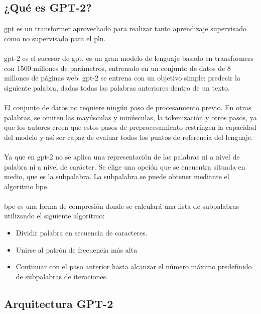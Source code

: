 \documentclass[12pt, a4paper, titlepage]{report}
\begin{document}
		        \subsection{¿Qué es GPT-2?}  
		        \acrfull{gpt} es un transformer aprovechado para realizar tanto aprendizaje supervisado como no supervisado para el \acrfull{pln}.\\\\        
		        \acrshort{gpt}-2 es el sucesor de \acrshort{gpt}, es un gran modelo de lenguaje basado en transformers con 1500 millones de parámetros, entrenado en un conjunto de datos de 8 millones de páginas web. \acrshort{gpt}-2 se entrena con un objetivo simple: predecir la siguiente palabra, dadas todas las palabras anteriores dentro de un texto. \cite{refQueesgpt}\\\\
		        El conjunto de datos no requiere ningún paso de procesamiento previo. En otras palabras, se omiten las mayúsculas y minúsculas, la tokenización y otros pasos, ya que los autores creen que estos pasos de preprocesamiento restringen la capacidad del modelo y así ser capaz de evaluar todos los puntos de referencia del lenguaje.\\\\        
		        Ya que en \acrshort{gpt}-2 no se aplica una representación de las palabras ni a nivel de palabra ni a nivel de carácter. Se elige una opción que se encuentra situada en medio, que es la subpalabra. La subpalabra se puede obtener mediante el algoritmo \acrfull{bpe}.\\\\
		        \acrshort{bpe} es una forma de compresión donde se calculará una lista de subpalabras utilizando el siguiente algoritmo: \cite{refbpe}
		        \begin{itemize}
		        	\item Dividir palabra en secuencia de caracteres.
		        	\item Unirse al patrón de frecuencia más alta
		        	\item Continuar con el paso anterior hasta alcanzar el número máximo predefinido de subpalabras de iteraciones.
		        \end{itemize}
		    
		    	\subsection{Arquitectura GPT-2}
		    	
\end{document}
